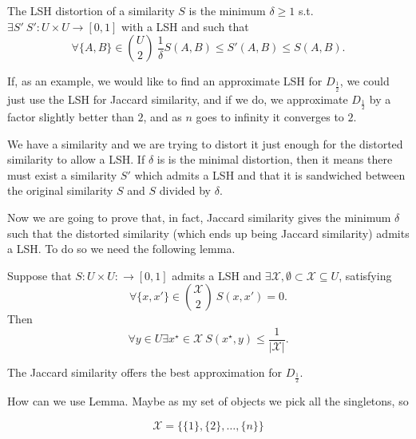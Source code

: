 \begin{defn}
	The LSH distortion of a similarity $S$ is the minimum $\delta \geq 1$ s.t. 	$\exists S'\ S': U \times U \rightarrow [0, 1]$ with a LSH and such that
	\begin{equation}
	 \forall \{A, B\} \in \binom{U}{2}\ \frac{1}{\delta} S(A, B) \leq S'(A,B) \leq S(A, B).
	\end{equation}
\end{defn}

If, as an example, we would like to find an approximate LSH for $D_\frac{1}{2}$, we could just use the LSH for Jaccard similarity, and if we do, we approximate $D_\frac{1}{2}$ by a factor slightly better than $2$, and as $n$ goes to infinity it converges to $2$.

We have a similarity and we are trying to distort it just enough for the distorted similarity to allow a LSH. If $\delta$ is is the minimal distortion, then it means there must exist a similarity $S'$ which admits a LSH and that it is sandwiched between the original similarity $S$ and $S$ divided by $\delta$.

Now we are going to prove that, in fact, Jaccard similarity gives the minimum $\delta$ such that the distorted similarity (which ends up being Jaccard similarity) admits a LSH. To do so we need the following lemma.

\begin{lem}\label{lem:lsh:dist_elements}
	Suppose that $S:U\times U: \rightarrow [0, 1]$ admits a LSH and $\exists \mathcal{X}, \emptyset \subset \mathcal{X} \subseteq U$, satisfying 
	\begin{equation} 
	\forall \{x, x'\} \in \binom{\mathcal{X}}{2}\ S(x, x') = 0.
	\end{equation} 
	Then 
	\begin{equation}
	\forall y \in U \exists x^\star \in \mathcal{X}\ S(x^\star, y) \leq \frac{1}{|\mathcal{X}|}.
	\end{equation}
\end{lem}

\begin{claim}
	The Jaccard similarity offers the best approximation for $D_\frac{1}{2}$.
\end{claim}

How can we use Lemma. Maybe as my set of objects we pick all the singletons, so

\begin{equation}
	\mathcal{X} = \{\{1\},\{2\}, \ldots, \{n\}\}
\end{equation}

